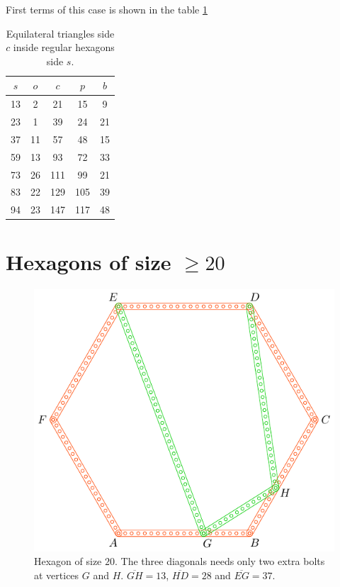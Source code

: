 \documentclass[11pt]{article}
\begin{document}
First terms of this case is shown in the table \ref{tbl:eqtriangles}
\begin{table}[H]
\begin{center}
\begin{tabular}{||c c c c c||} 
 \hline
 $s$ & $o$ & $c$ & $p$ & $b$ \\ [0.5ex] 
 \hline\hline
  13 &  2 &  21 &  15 &  9 \\ \hline
  23 &  1 &  39 &  24 & 21 \\ \hline
  37 & 11 &  57 &  48 & 15 \\ \hline
  59 & 13 &  93 &  72 & 33 \\ \hline
  73 & 26 & 111 &  99 & 21 \\ \hline
  83 & 22 & 129 & 105 & 39 \\ \hline
  94 & 23 & 147 & 117 & 48 \\ \hline
\end{tabular}
\caption{Equilateral triangles side $c$ inside regular hexagons side $s$.}
\label{tbl:eqtriangles}
\end{center}
\end{table}

\section{Hexagons of size $\ge 20$}

\begin{figure}[H]
\centering
\includegraphics[scale=1]{20/hexa-20a}
\caption{Hexagon of size $20$. The three diagonals needs only two extra bolts at vertices $G$ and $H$. $\overline{GH} = 13$, $\overline{HD} = 28$ and $\overline{EG} = 37$.}
\label{fig:20a}
\end{figure}
\end{document}
